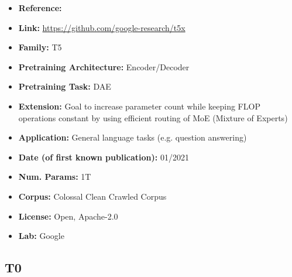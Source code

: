 \documentclass{article}
\begin{document}
            \begin{itemize}
                \item \textbf{Reference:} \href{https://arxiv.org/abs/2101.03961}{}
                \item \textbf{Link:} \url{https://github.com/google-research/t5x}
                \item \textbf{Family:} T5 
                \item \textbf{Pretraining Architecture:} Encoder/Decoder
                \item \textbf{Pretraining Task:} DAE
                \item \textbf{Extension:} Goal to increase parameter count while keeping FLOP operations constant by using efficient routing of MoE (Mixture of Experts)  
                \item \textbf{Application:} General language tasks (e.g. question answering)
                \item \textbf{Date (of first known publication):} 01/2021
                \item \textbf{Num. Params:} 1T
                \item \textbf{Corpus:} Colossal Clean Crawled Corpus
                \item \textbf{License:} Open, Apache-2.0
                \item \textbf{Lab:} Google
            \end{itemize}

\subsection{T0}
\end{document}
